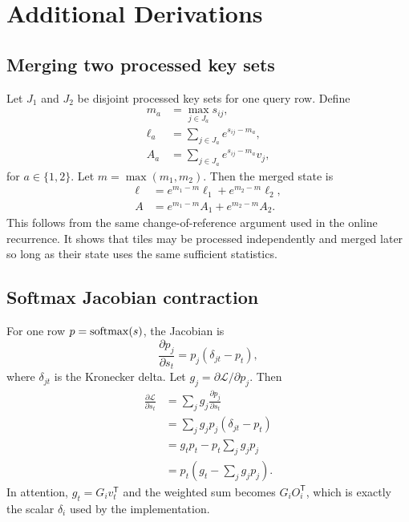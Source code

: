 \chapter{Additional Derivations}
\label{app:derivations}

\section{Merging two processed key sets}

Let $J_1$ and $J_2$ be disjoint processed key sets for one query row. Define
\begin{align}
  m_a &= \max_{j\in J_a} s_{ij}, \\
  \ell_a &= \sum_{j\in J_a} e^{s_{ij}-m_a}, \\
  A_a &= \sum_{j\in J_a} e^{s_{ij}-m_a} v_j,
\end{align}
for $a\in\{1,2\}$. Let $m = \max(m_1,m_2)$. Then the merged state is
\begin{align}
  \ell &= e^{m_1-m}\ell_1 + e^{m_2-m}\ell_2, \\
  A &= e^{m_1-m}A_1 + e^{m_2-m}A_2.
\end{align}
This follows from the same change-of-reference argument used in the online recurrence. It shows that tiles may be processed independently and merged later so long as their state uses the same sufficient statistics.

\section{Softmax Jacobian contraction}

For one row $p = \operatorname{softmax}(s)$, the Jacobian is
\begin{equation}
  \frac{\partial p_j}{\partial s_t} = p_j(\delta_{jt} - p_t),
\end{equation}
where $\delta_{jt}$ is the Kronecker delta. Let $g_j = \partial \mathcal L/\partial p_j$. Then
\begin{align}
  \frac{\partial \mathcal L}{\partial s_t}
  &= \sum_j g_j \frac{\partial p_j}{\partial s_t} \\
  &= \sum_j g_j p_j (\delta_{jt} - p_t) \\
  &= g_t p_t - p_t \sum_j g_j p_j \\
  &= p_t \left(g_t - \sum_j g_j p_j\right).
\end{align}
In attention, $g_t = G_i v_t^{\mathsf T}$ and the weighted sum becomes $G_i O_i^{\mathsf T}$, which is exactly the scalar $\delta_i$ used by the implementation.

